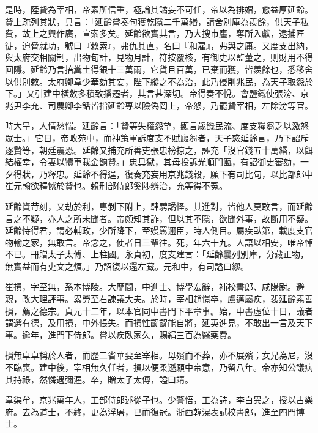 \begin{pinyinscope}
 是時，陸贄為宰相，帝素所信重，極論其譎妄不可任，帝以為排媢，愈益厚延齡。贄上疏列其狀，具言：「延齡嘗奏句獲乾隱二千萬緡，請舍別庫為羨餘，供天子私費，故上之興作廣，宣索多矣。延齡欲實其言，乃大搜市廛，奪所入獻，逮捕匠徒，迫脅就功，號曰『敕索』，弗仇其直，名曰『和雇』，弗與之庸。又度支出納，與太府交相關制，出物旬計，見物月計，符按覆核，有御史以監董之，則財用不得回隱。延齡乃言掊糞土得銀十三萬兩，它貨且百萬，已棄而獲，皆羨餘也，悉移舍以供別敕。太府卿韋少華劾其妄，陛下縱之不為治，此乃侵削兆民，為天子取怨於下。」又引建中橫斂多積致播遷者，其言甚深切。帝得奏不悅。會鹽鐵使張滂、京兆尹李充、司農卿李銛皆指延齡專以險偽罔上，帝怒，乃罷贄宰相，左除滂等官。



 時大旱，人情愁惴。延齡言：「贄等失權怨望，顯言歲饑民流、度支糧芻乏以激怒眾士。」它日，帝畋苑中，而神策軍訴度支不賦廄芻者，天子惑延齡言，乃下詔斥逐贄等，朝廷震恐。延齡又捕充所善吏張忠榜掠之，誣充「沒官錢五十萬緡，以餌結權幸，令妻以犢車載金餉贄。」忠具獄，其母投訴光順門匭，有詔御史審劾，一夕得狀，乃釋忠。延齡不得逞，復奏充妄用京兆錢穀，願下有司比句，以比部郎中崔元翰欲釋憾於贄也。賴刑部侍郎奚陟辨治，充等得不冤。



 延齡資苛刻，又劫於利，專剝下附上，肆騁譎怪。其進對，皆他人莫敢言，而延齡言之不疑，亦人之所未聞者。帝頗知其詐，但以其不隱，欲聞外事，故斷用不疑。延齡恃得君，謂必輔政，少所降下，至嫚罵邇臣，時人側目。屬疾臥第，載度支官物輸之家，無敢言。帝念之，使者日三輩往。死，年六十九。人語以相安，唯帝悼不已。冊贈太子太傅、上柱國。永貞初，度支建言：「延齡曩列別庫，分藏正物，無實益而有吏文之煩。」乃詔復以還左藏。元和中，有司謚曰繆。



 崔損，字至無，系本博陵。大歷間，中進士、博學宏辭，補校書郎、咸陽尉。避親，改大理評事。累勞至右諫議大夫。於時，宰相趙憬卒，盧邁屬疾，裴延齡素善損，薦之德宗。貞元十二年，以本官同中書門下平章事。始，中書虛位十日，議者謂選有德，及用損，中外悵失。而損性齪齪能自將，延英進見，不敢出一言及天下事。逾年，進門下侍郎。嘗以疾臥家久，賜絹三百為醫藥費。



 損無卓卓稱於人者，而歷二省華要至宰相。母殯而不葬，亦不展殯；女兄為尼，沒不臨喪。建中後，宰相無久任者，損以便柔遜願中帝意，乃留八年。帝亦知公議病其持祿，然憐遇彌渥。卒，贈太子太傅，謚曰靖。



 韋渠牟，京兆萬年人，工部侍郎述從子也。少警悟，工為詩，李白異之，授以古樂府。去為道士，不終，更為浮屠，已而復冠。浙西韓滉表試校書郎，進至四門博士。




\end{pinyinscope}
